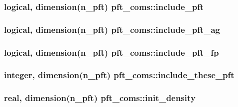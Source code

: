 \subsubsection[{\texorpdfstring{include\+\_\+pft}{include_pft}}]{\setlength{\rightskip}{0pt plus 5cm}logical, dimension(n\+\_\+pft) pft\+\_\+coms\+::include\+\_\+pft}\hypertarget{namespacepft__coms_a01416a40237dfc9b75e2205ff91ef2be}{}\label{namespacepft__coms_a01416a40237dfc9b75e2205ff91ef2be}
\subsubsection[{\texorpdfstring{include\+\_\+pft\+\_\+ag}{include_pft_ag}}]{\setlength{\rightskip}{0pt plus 5cm}logical, dimension(n\+\_\+pft) pft\+\_\+coms\+::include\+\_\+pft\+\_\+ag}\hypertarget{namespacepft__coms_a39d76f589c044b393db74ff7392193c7}{}\label{namespacepft__coms_a39d76f589c044b393db74ff7392193c7}
\subsubsection[{\texorpdfstring{include\+\_\+pft\+\_\+fp}{include_pft_fp}}]{\setlength{\rightskip}{0pt plus 5cm}logical, dimension(n\+\_\+pft) pft\+\_\+coms\+::include\+\_\+pft\+\_\+fp}\hypertarget{namespacepft__coms_adc76e53cf81aef56357b589214fd3700}{}\label{namespacepft__coms_adc76e53cf81aef56357b589214fd3700}
\subsubsection[{\texorpdfstring{include\+\_\+these\+\_\+pft}{include_these_pft}}]{\setlength{\rightskip}{0pt plus 5cm}integer, dimension(n\+\_\+pft) pft\+\_\+coms\+::include\+\_\+these\+\_\+pft}\hypertarget{namespacepft__coms_a7ab2f215846d8f15e70deeb77fa8802e}{}\label{namespacepft__coms_a7ab2f215846d8f15e70deeb77fa8802e}
\subsubsection[{\texorpdfstring{init\+\_\+density}{init_density}}]{\setlength{\rightskip}{0pt plus 5cm}real, dimension(n\+\_\+pft) pft\+\_\+coms\+::init\+\_\+density}\hypertarget{namespacepft__coms_aad950f9e3b7c51796f0c72acbf85198d}{}\label{namespacepft__coms_aad950f9e3b7c51796f0c72acbf85198d}
